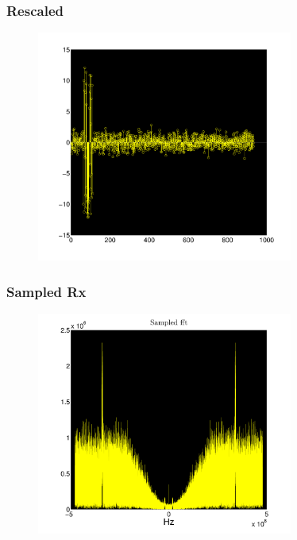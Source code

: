 \documentclass[11pt]{beamer} %
\begin{document}
\begin{frame}
 \frametitle{Rescaled}
\begin{figure}
\includegraphics[width=0.75\textwidth]{Figures/SampledRxCombinedFilterSampRescale.pdf}
\end{figure}
\end{frame}

\begin{frame}
 \frametitle{Sampled  Rx}
\begin{figure}
\includegraphics[width=0.75\textwidth]{Figures/SampledRxFft.pdf}
\end{figure}
\end{frame}
\end{document}
